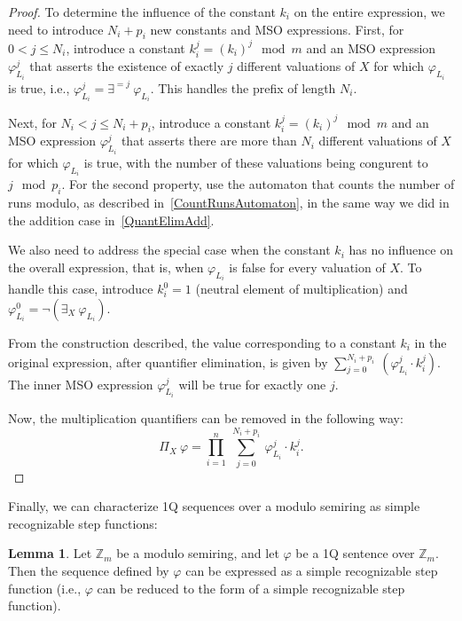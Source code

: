 \documentclass[12pt]{article}
\theoremstyle{definition}
\newtheorem{lemma}[theorem]{Lemma}
\begin{document}
\begin{proof}
    To determine the influence of the constant $k_i$ on the entire expression, we need to introduce $N_i + p_i$ new constants and MSO expressions. First, for $0 < j \leq N_i$, introduce a constant $k_i^j = (k_i)^j \mod m$ and an MSO expression $\varphi_{L_i}^j$ that asserts the existence of exactly $j$ different valuations of $X$ for which $\varphi_{L_i}$ is true, i.e., $\varphi_{L_i}^j = \exists^{=j} \ \varphi_{L_i}$. This handles the prefix of length $N_i$.
    
    Next, for $N_i < j \leq N_i + p_i$, introduce a constant $k_i^j = (k_i)^j \mod m$ and an MSO expression $\varphi_{L_i}^j$ that asserts there are more than $N_i$ different valuations of $X$ for which $\varphi_{L_i}$ is true, with the number of these valuations being congurent to $j \mod p_i$. For the second property, use the automaton that counts the number of runs modulo, as described in~\cref{CountRunsAutomaton}, in the same way we did in the addition case in~\cref{QuantElimAdd}.

    We also need to address the special case when the constant $k_i$ has no influence on the overall expression, that is, when $\varphi_{L_i}$ is false for every valuation of $X$. To handle this case, introduce $k_i^0 = 1$ (neutral element of multiplication) and $\varphi_{L_i}^0 = \neg(\exists_X \ \varphi_{L_i})$.

    From the construction described, the value corresponding to a constant $k_i$ in the original expression, after quantifier elimination, is given by $\sum_{j = 0}^{N_i + p_i} \ (\varphi_{L_i}^j \cdot k_i^j)$. The inner MSO expression $\varphi_{L_i}^j$ will be true for exactly one $j$.
    
    Now, the multiplication quantifiers can be removed in the following way:
    $$\Pi_X \ \varphi = \prod_{i = 1}^n \ \sum_{j = 0}^{N_i + p_i} \ \varphi_{L_i}^j \cdot k_i^j.$$
\end{proof}

Finally, we can characterize 1Q sequences over a modulo semiring as simple recognizable step functions:

\begin{lemma}
    \label{OverModAreSimpleRec}
    Let $\mathbb{Z}_m$ be a modulo semiring, and let $\varphi$ be a 1Q sentence over $\mathbb{Z}_m$. Then the sequence defined by $\varphi$ can be expressed as a simple recognizable step function (i.e., $\varphi$ can be reduced to the form of a simple recognizable step function). 
\end{lemma}
\end{document}
